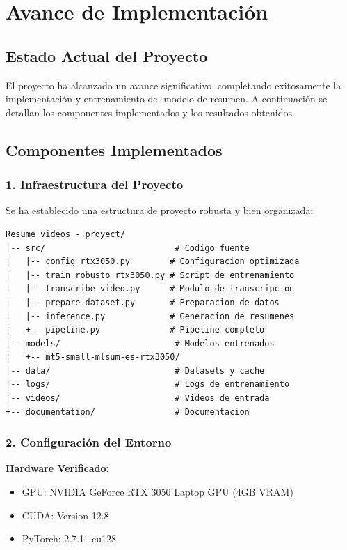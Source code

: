 \documentclass[12pt,a4paper]{article}
\begin{document}
\section{Avance de Implementación}

\subsection{Estado Actual del Proyecto}

El proyecto ha alcanzado un avance significativo, completando exitosamente la implementación y entrenamiento del modelo de resumen. A continuación se detallan los componentes implementados y los resultados obtenidos.

\subsection{Componentes Implementados}

\subsubsection{1. Infraestructura del Proyecto}

Se ha establecido una estructura de proyecto robusta y bien organizada:

\begin{verbatim}
Resume videos - proyect/
|-- src/                          # Codigo fuente
|   |-- config_rtx3050.py        # Configuracion optimizada
|   |-- train_robusto_rtx3050.py # Script de entrenamiento
|   |-- transcribe_video.py      # Modulo de transcripcion
|   |-- prepare_dataset.py       # Preparacion de datos
|   |-- inference.py             # Generacion de resumenes
|   +-- pipeline.py              # Pipeline completo
|-- models/                       # Modelos entrenados
|   +-- mt5-small-mlsum-es-rtx3050/
|-- data/                         # Datasets y cache
|-- logs/                         # Logs de entrenamiento
|-- videos/                       # Videos de entrada
+-- documentation/                # Documentacion
\end{verbatim}

\subsubsection{2. Configuración del Entorno}
\textbf{Hardware Verificado:}
\begin{itemize}
    \item GPU: NVIDIA GeForce RTX 3050 Laptop GPU (4GB VRAM) \checkmark
    \item CUDA: Version 12.8 \checkmark
    \item PyTorch: 2.7.1+cu128 \checkmark
\end{itemize}
\end{document}
